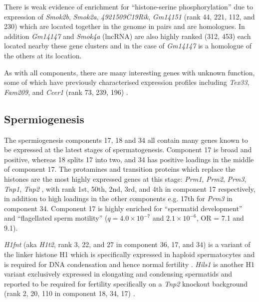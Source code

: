 There is weak evidence of enrichment for ``histone-serine phosphorylation'' due to expression of \textit{Smok2b}, \textit{Smok2a}, \textit{4921509C19Rik}, \textit{Gm14151} (rank 44, 221, 112, and 230) which are located together in the genome in pairs and are homologues. In addition \textit{Gm14147} and \textit{Smok4a} (lncRNA) are also highly ranked (312, 453) each located nearby these gene clusters and in the case of \textit{Gm14147} is a homologue of the others at its location.

As with all components, there are many interesting genes with unknown function, some of which have previously characterised expression profiles including \textit{Tex33}, \textit{Fam209}, and \textit{Ccer1} (rank 73, 239, 196) \parencite{Kwon2017Expression}.


\subsection{Spermiogenesis}

The spermiogenesis components 17, 18 and 34 all contain many genes known to be expressed at the latest stages of spermatogenesis. Component 17 is broad and positive, whereas 18 splits 17 into two, and 34 has positive loadings in the middle of component 17. The protamines and transition proteins which replace the histones are the most highly expressed genes at this stage: \textit{Prm1}, \textit{Prm2}, \textit{Prm3}, \textit{Tnp1}, \textit{Tnp2} \parencite{Sassone-Corsi2002Unique}, with rank 1st, 50th, 2nd, 3rd, and 4th in component 17 respectively, in addition to high loadings in the other components e.g. 17th for \textit{Prm3} in component 34. Component 17 is highly enriched for ``spermatid development'' and ``flagellated sperm motility'' ($q = 4.0\times10^{-7}$ and $2.1\times10^{-6}$, OR = 7.1 and 9.1).

\textit{H1fnt} (aka \textit{H1t2}, rank 3, 22, and 27 in component 36, 17, and 34) is a variant of the linker histone H1 which is specifically expressed in haploid spermatocytes and is required for DNA condensation and hence normal fertility \parencite{Martianov2005Polar, Tanaka2005HANP1}. \textit{Hils1} is another H1 variant exclusively expressed in elongating and condensing spermatids and reported to be required for fertility specifically on a \textit{Tnp2} knockout background (rank 2, 20, 110 in component 18, 34, 17) \parencite{Yan2003HILS1, Wu2009Genetic}.

